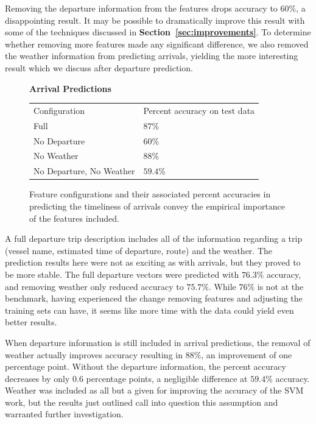\documentclass[11pt]{article} %
\begin{document}
Removing the departure information from the features drops accuracy to $60\%$, 
a disappointing result. It may be possible to dramatically improve this result with
some of the techniques discussed in \textbf{Section~\ref{sec:improvements}}.
To determine whether removing more features made any significant difference, we
also removed the weather information from predicting arrivals, yielding 
the more interesting result which we discuss after departure prediction.

\begin{figure}
    \centering
    \textbf{Arrival Predictions}

    \begin{tabular}{ll}
        Configuration & Percent accuracy on test data\\
        Full          & $87\%$\\
        No Departure  & $60\%$\\
        No Weather    & $88\%$\\
        No Departure, No Weather  & $59.4\%$\\
    \end{tabular}
    \caption{Feature configurations and their associated percent accuracies in
         predicting the timeliness of arrivals convey the empirical importance of 
         the features included.}
    \label{fig:second_run_data_arrivals}
\end{figure}

A full departure trip description includes all of the information regarding a trip
(vessel name, estimated time of departure, route) and the weather. 
The prediction results here were not
as exciting as with arrivals, but they proved to be more stable. The full 
departure vectors were predicted with $76.3\%$ accuracy, and removing weather
only reduced accuracy to $75.7\%$. While $76\%$ is not at the benchmark, having
experienced the change removing features and adjusting the training sets can have,
it seems like more time with the data could yield even better results.

When departure information is still included in arrival predictions, the removal of 
weather actually improves accuracy resulting in $88\%$, an improvement of one
percentage point. Without the departure information, the percent accuracy decreases
by only $0.6$ percentage points, a negligible difference at $59.4\%$ accuracy. 
Weather was included as all but a given for improving the accuracy of the SVM
work, but the results just outlined call into question this assumption and 
warranted further investigation.
\end{document}

